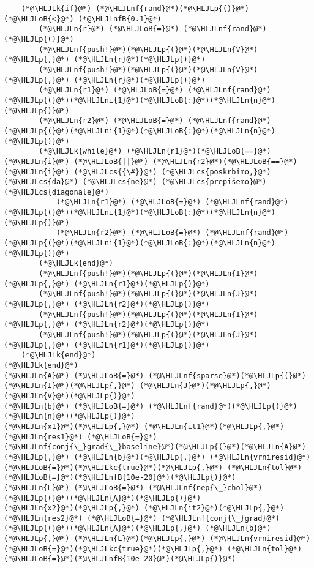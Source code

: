 \documentclass[12pt,a4paper]{article}
\newcommand{\HLJLk}[1]{\textcolor[RGB]{148,91,176}{\textbf{#1}}}
\newcommand{\HLJLkc}[1]{\textcolor[RGB]{59,151,46}{\textit{#1}}}
\newcommand{\HLJLn}[1]{#1}
\newcommand{\HLJLnf}[1]{\textcolor[RGB]{66,102,213}{#1}}
\newcommand{\HLJLnfB}[1]{\textcolor[RGB]{59,151,46}{#1}}
\newcommand{\HLJLni}[1]{\textcolor[RGB]{59,151,46}{#1}}
\newcommand{\HLJLoB}[1]{\textcolor[RGB]{102,102,102}{\textbf{#1}}}
\newcommand{\HLJLp}[1]{#1}
\newcommand{\HLJLcs}[1]{\textcolor[RGB]{153,153,119}{\textit{#1}}}
\begin{document}
\begin{lstlisting}
    (*@\HLJLk{if}@*) (*@\HLJLnf{rand}@*)(*@\HLJLp{()}@*) (*@\HLJLoB{<}@*) (*@\HLJLnfB{0.1}@*)
        (*@\HLJLn{r}@*) (*@\HLJLoB{=}@*) (*@\HLJLnf{rand}@*)(*@\HLJLp{()}@*)
        (*@\HLJLnf{push!}@*)(*@\HLJLp{(}@*)(*@\HLJLn{V}@*)(*@\HLJLp{,}@*) (*@\HLJLn{r}@*)(*@\HLJLp{)}@*)
        (*@\HLJLnf{push!}@*)(*@\HLJLp{(}@*)(*@\HLJLn{V}@*)(*@\HLJLp{,}@*) (*@\HLJLn{r}@*)(*@\HLJLp{)}@*)
        (*@\HLJLn{r1}@*) (*@\HLJLoB{=}@*) (*@\HLJLnf{rand}@*)(*@\HLJLp{(}@*)(*@\HLJLni{1}@*)(*@\HLJLoB{:}@*)(*@\HLJLn{n}@*)(*@\HLJLp{)}@*)
        (*@\HLJLn{r2}@*) (*@\HLJLoB{=}@*) (*@\HLJLnf{rand}@*)(*@\HLJLp{(}@*)(*@\HLJLni{1}@*)(*@\HLJLoB{:}@*)(*@\HLJLn{n}@*)(*@\HLJLp{)}@*)
        (*@\HLJLk{while}@*) (*@\HLJLn{r1}@*)(*@\HLJLoB{==}@*)(*@\HLJLn{i}@*) (*@\HLJLoB{||}@*) (*@\HLJLn{r2}@*)(*@\HLJLoB{==}@*)(*@\HLJLn{i}@*) (*@\HLJLcs{{\#}}@*) (*@\HLJLcs{poskrbimo,}@*) (*@\HLJLcs{da}@*) (*@\HLJLcs{ne}@*) (*@\HLJLcs{prepišemo}@*) (*@\HLJLcs{diagonale}@*)
            (*@\HLJLn{r1}@*) (*@\HLJLoB{=}@*) (*@\HLJLnf{rand}@*)(*@\HLJLp{(}@*)(*@\HLJLni{1}@*)(*@\HLJLoB{:}@*)(*@\HLJLn{n}@*)(*@\HLJLp{)}@*)
            (*@\HLJLn{r2}@*) (*@\HLJLoB{=}@*) (*@\HLJLnf{rand}@*)(*@\HLJLp{(}@*)(*@\HLJLni{1}@*)(*@\HLJLoB{:}@*)(*@\HLJLn{n}@*)(*@\HLJLp{)}@*)
        (*@\HLJLk{end}@*)
        (*@\HLJLnf{push!}@*)(*@\HLJLp{(}@*)(*@\HLJLn{I}@*)(*@\HLJLp{,}@*) (*@\HLJLn{r1}@*)(*@\HLJLp{)}@*)
        (*@\HLJLnf{push!}@*)(*@\HLJLp{(}@*)(*@\HLJLn{J}@*)(*@\HLJLp{,}@*) (*@\HLJLn{r2}@*)(*@\HLJLp{)}@*)
        (*@\HLJLnf{push!}@*)(*@\HLJLp{(}@*)(*@\HLJLn{I}@*)(*@\HLJLp{,}@*) (*@\HLJLn{r2}@*)(*@\HLJLp{)}@*)
        (*@\HLJLnf{push!}@*)(*@\HLJLp{(}@*)(*@\HLJLn{J}@*)(*@\HLJLp{,}@*) (*@\HLJLn{r1}@*)(*@\HLJLp{)}@*)
    (*@\HLJLk{end}@*)
(*@\HLJLk{end}@*)
(*@\HLJLn{A}@*) (*@\HLJLoB{=}@*) (*@\HLJLnf{sparse}@*)(*@\HLJLp{(}@*)(*@\HLJLn{I}@*)(*@\HLJLp{,}@*) (*@\HLJLn{J}@*)(*@\HLJLp{,}@*) (*@\HLJLn{V}@*)(*@\HLJLp{)}@*)
(*@\HLJLn{b}@*) (*@\HLJLoB{=}@*) (*@\HLJLnf{rand}@*)(*@\HLJLp{(}@*)(*@\HLJLn{n}@*)(*@\HLJLp{)}@*)
(*@\HLJLn{x1}@*)(*@\HLJLp{,}@*) (*@\HLJLn{it1}@*)(*@\HLJLp{,}@*) (*@\HLJLn{res1}@*) (*@\HLJLoB{=}@*) (*@\HLJLnf{conj{\_}grad{\_}baseline}@*)(*@\HLJLp{(}@*)(*@\HLJLn{A}@*)(*@\HLJLp{,}@*) (*@\HLJLn{b}@*)(*@\HLJLp{,}@*) (*@\HLJLn{vrniresid}@*)(*@\HLJLoB{=}@*)(*@\HLJLkc{true}@*)(*@\HLJLp{,}@*) (*@\HLJLn{tol}@*)(*@\HLJLoB{=}@*)(*@\HLJLnfB{10e-20}@*)(*@\HLJLp{)}@*)
(*@\HLJLn{L}@*) (*@\HLJLoB{=}@*) (*@\HLJLnf{nep{\_}chol}@*)(*@\HLJLp{(}@*)(*@\HLJLn{A}@*)(*@\HLJLp{)}@*)
(*@\HLJLn{x2}@*)(*@\HLJLp{,}@*) (*@\HLJLn{it2}@*)(*@\HLJLp{,}@*) (*@\HLJLn{res2}@*) (*@\HLJLoB{=}@*) (*@\HLJLnf{conj{\_}grad}@*)(*@\HLJLp{(}@*)(*@\HLJLn{A}@*)(*@\HLJLp{,}@*) (*@\HLJLn{b}@*)(*@\HLJLp{,}@*) (*@\HLJLn{L}@*)(*@\HLJLp{,}@*) (*@\HLJLn{vrniresid}@*)(*@\HLJLoB{=}@*)(*@\HLJLkc{true}@*)(*@\HLJLp{,}@*) (*@\HLJLn{tol}@*)(*@\HLJLoB{=}@*)(*@\HLJLnfB{10e-20}@*)(*@\HLJLp{)}@*)


\end{lstlisting}
\end{document}
